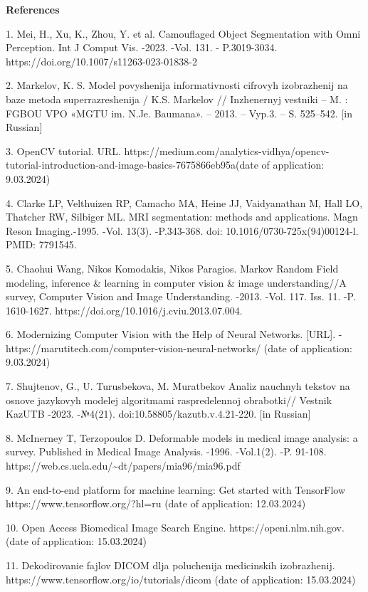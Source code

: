 {\bfseries References}

1. Mei, H., Xu, K., Zhou, Y. et al. Camouflaged Object Segmentation with
Omni Perception. Int J Comput Vis. -2023. -Vol. 131. - P.3019-3034.
https://doi.org/10.1007/s11263-023-01838-2

2. Markelov, K. S. Model\textquotesingle{} povyshenija informativnosti
cifrovyh izobrazhenij na baze metoda superrazreshenija / K.S. Markelov
// Inzhenernyj vestniki -- M. : FGBOU VPO «MGTU im. N.Je. Baumana». --
2013. -- Vyp.3. -- S. 525--542. {[}in Russian{]}

3. OpenCV tutorial. URL.
https://medium.com/analytics-vidhya/opencv-tutorial-introduction-and-image-basics-7675866eb95a(date
of application: 9.03.2024)

4. Clarke LP, Velthuizen RP, Camacho MA, Heine JJ, Vaidyanathan M, Hall
LO, Thatcher RW, Silbiger ML. MRI segmentation: methods and
applications. Magn Reson Imaging.-1995. -Vol. 13(3). -P.343-368. doi:
10.1016/0730-725x(94)00124-l. PMID: 7791545.

5. Chaohui Wang, Nikos Komodakis, Nikos Paragios. Markov Random Field
modeling, inference \& learning in computer vision \& image
understanding//A survey, Computer Vision and Image Understanding. -2013.
-Vol. 117. Iss. 11. -P. 1610-1627.
https://doi.org/10.1016/j.cviu.2013.07.004.

6. Modernizing Computer Vision with the Help of Neural Networks.
{[}URL{]}. - https://marutitech.com/computer-vision-neural-networks/
(date of application: 9.03.2024)

7. Shujtenov, G., U. Turusbekova, M. Muratbekov Analiz nauchnyh tekstov
na osnove jazykovyh modelej algoritmami raspredelennoj obrabotki//
Vestnik KazUTB -2023. -№4(21). doi:10.58805/kazutb.v.4.21-220. {[}in
Russian{]}

8. McInerney T, Terzopoulos D. Deformable models in medical image
analysis: a survey. Published in Medical Image Analysis. -1996.
-Vol.1(2). -P. 91-108.
https://web.cs.ucla.edu/\textasciitilde dt/papers/mia96/mia96.pdf

9. An end-to-end platform for machine learning: Get started with
TensorFlow https://www.tensorflow.org/?hl=ru (date of application:
12.03.2024)

10. Open Access Biomedical Image Search Engine.
https://openi.nlm.nih.gov. (date of application: 15.03.2024)

11. Dekodirovanie fajlov DICOM dlja poluchenija medicinskih
izobrazhenij. https://www.tensorflow.org/io/tutorials/dicom (date of
application: 15.03.2024)

